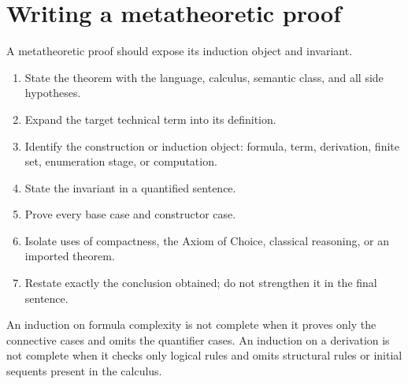 \section{Writing a metatheoretic proof}
\label{sec:formal-practice-04}

A metatheoretic proof should expose its induction object and invariant.

\begin{method}
\begin{enumerate}
  \item State the theorem with the language, calculus, semantic class, and all
        side hypotheses.
  \item Expand the target technical term into its definition.
  \item Identify the construction or induction object: formula, term,
        derivation, finite set, enumeration stage, or computation.
  \item State the invariant in a quantified sentence.
  \item Prove every base case and constructor case.
  \item Isolate uses of compactness, the Axiom of Choice, classical reasoning, or an imported
        theorem.
  \item Restate exactly the conclusion obtained; do not strengthen it in the
        final sentence.
\end{enumerate}
\end{method}

\begin{warning}
An induction on formula complexity is not complete when it proves only the
connective cases and omits the quantifier cases.  An induction on a derivation
is not complete when it checks only logical rules and omits structural rules or
initial sequents present in the calculus.
\end{warning}

